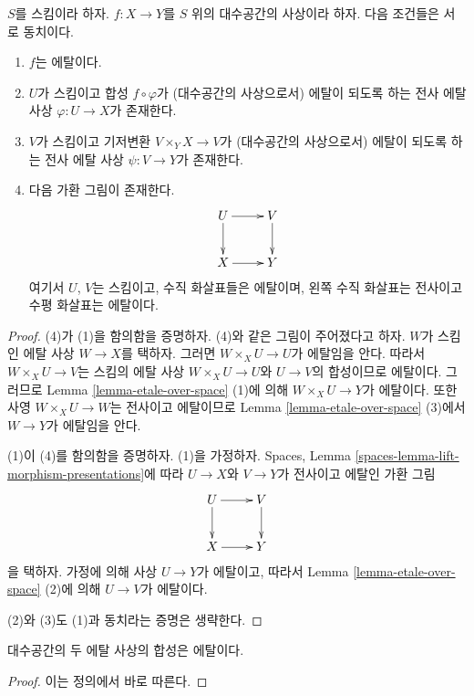 \begin{lemma}
\label{lemma-etale-local}
$S$를 스킴이라 하자.
$f : X \to Y$를 $S$ 위의 대수공간의 사상이라 하자.
다음 조건들은 서로 동치이다.
\begin{enumerate}
\item $f$는 에탈이다.
\item $U$가 스킴이고 합성 $f \circ \varphi$가
(대수공간의 사상으로서) 에탈이 되도록 하는 전사 에탈 사상
$\varphi : U \to X$가 존재한다.
\item $V$가 스킴이고 기저변환 $V \times_Y X \to V$가
(대수공간의 사상으로서) 에탈이 되도록 하는 전사 에탈 사상
$\psi : V \to Y$가 존재한다.
\item 다음 가환 그림이 존재한다.
$$
\xymatrix{
U \ar[d] \ar[r] & V \ar[d] \\
X \ar[r] & Y
}
$$
여기서 $U$, $V$는 스킴이고, 수직 화살표들은 에탈이며,
왼쪽 수직 화살표는 전사이고 수평 화살표는 에탈이다.
\end{enumerate}
\end{lemma}

\begin{proof}
(4)가 (1)을 함의함을 증명하자. (4)와 같은 그림이 주어졌다고 하자.
$W$가 스킴인 에탈 사상 $W \to X$를 택하자. 그러면
$W \times_X U \to U$가 에탈임을 안다. 따라서
$W \times_X U \to V$는 스킴의 에탈 사상
$W \times_X U \to U$와 $U \to V$의 합성이므로 에탈이다.
그러므로 Lemma \ref{lemma-etale-over-space} (1)에 의해
$W \times_X U \to Y$가 에탈이다. 또한 사영
$W \times_X U \to W$는 전사이고 에탈이므로
Lemma \ref{lemma-etale-over-space} (3)에서 $W \to Y$가 에탈임을 안다.

\medskip\noindent
(1)이 (4)를 함의함을 증명하자. (1)을 가정하자.
Spaces, Lemma \ref{spaces-lemma-lift-morphism-presentations}에 따라
$U \to X$와 $V \to Y$가 전사이고 에탈인 가환 그림
$$
\xymatrix{
U \ar[d] \ar[r] & V \ar[d] \\
X \ar[r] & Y
}
$$
을 택하자. 가정에 의해 사상 $U \to Y$가 에탈이고, 따라서
Lemma \ref{lemma-etale-over-space} (2)에 의해 $U \to V$가 에탈이다.

\medskip\noindent
(2)와 (3)도 (1)과 동치라는 증명은 생략한다.
\end{proof}

\begin{lemma}
\label{lemma-composition-etale}
대수공간의 두 에탈 사상의 합성은 에탈이다.
\end{lemma}

\begin{proof}
이는 정의에서 바로 따른다.
\end{proof}

